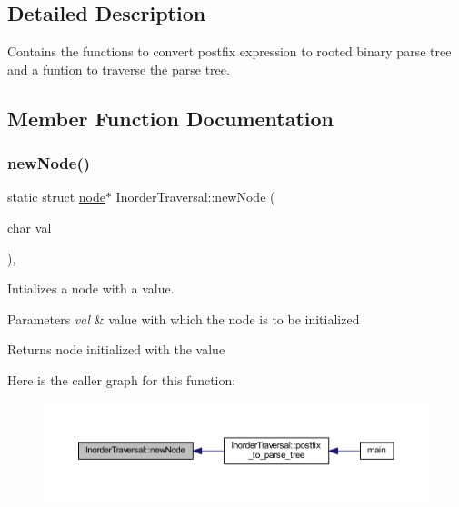 \subsection{Detailed Description}
Contains the functions to convert postfix expression to rooted binary parse tree and a funtion to traverse the parse tree. 

\subsection{Member Function Documentation}
\mbox{\label{class_inorder_traversal_afdc83589caa4e0b0fe266cd147ed80c4}} 
\subsubsection{\texorpdfstring{new\+Node()}{newNode()}}
{\footnotesize\ttfamily static struct \mbox{\hyperlink{struct_inorder_traversal_1_1node}{node}}$\ast$ Inorder\+Traversal\+::new\+Node (\begin{DoxyParamCaption}\item[{char}]{val }\end{DoxyParamCaption})\hspace{0.3cm}{\ttfamily [inline]}, {\ttfamily [static]}}



Intializes a node with a value. 


\begin{DoxyParams}{Parameters}
{\em val} & value with which the node is to be initialized \\
\hline
\end{DoxyParams}
\begin{DoxyReturn}{Returns}
node initialized with the value 
\end{DoxyReturn}
Here is the caller graph for this function\+:\nopagebreak
\begin{figure}[H]
\begin{center}
\leavevmode
\includegraphics[width=350pt]{class_inorder_traversal_afdc83589caa4e0b0fe266cd147ed80c4_icgraph}
\end{center}
\end{figure}
\mbox{\label{class_inorder_traversal_a0997a41c18ddf565f5f460446ef3c8a2}} 
